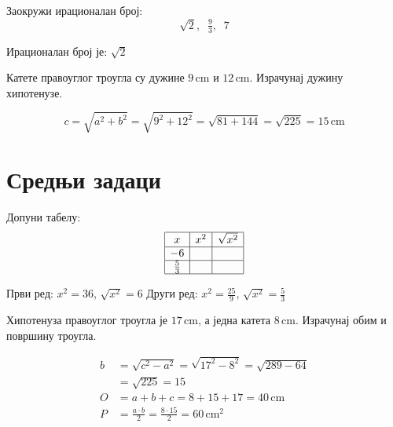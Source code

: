 \documentclass[11pt,a5paper,twoside,addpoints,noanswers]{exam} %
\newcommand{\measure}[2]{\mathrm{#1\,#2}}
\newcommand{\variant}[3]{#1}
\begin{document}
\begin{questions}
\question[2]
Заокружи ирационалан број:  
$$
\variant{\sqrt{2},\;\;\tfrac{9}{3},\;\;7}{-5,\;\;\sqrt{18},\;\;2}{\tfrac{4}{5},\;\;\sqrt{5},\;\;1,\!2}
$$
\begin{solution}[\stretch 1]
Ирационалан број је:  
\variant{$\sqrt{2}$}{$\sqrt{18}$}{$\sqrt{5}$}
\end{solution}

\ifprintanswers\else\newpage\fi

\question[3]
Катете правоуглог троугла су дужине
$\measure{\variant{9}{12}{8}}{cm}$ и
$\measure{\variant{12}{5}{15}}{cm}$.  
Израчунај дужину хипотенузе.
\begin{solution}[\stretch 2]
\[
c=\sqrt{a^2+b^2}=\sqrt{\variant{9^2+12^2}{12^2+5^2}{8^2+15^2}}
=\sqrt{\variant{81+144}{144+25}{64+225}}
=\sqrt{\variant{225}{169}{289}}
=\measure{\variant{15}{13}{17}}{cm}
\]
\end{solution}

\ifprintanswers\newpage\else\fi

\section{Средњи задаци}

\question[4]
Допуни табелу:
$$
\begin{array}{|c|c|c|}\hline
x & x^2 & \sqrt{x^2}\\\hline
\variant{-6}{\tfrac{3}{2}}{-4} & & \\\hline
\variant{\tfrac{5}{3}}{-2}{1,\!7} & & \\\hline
\end{array}
$$
\begin{solution}[\stretch 2]
Први ред: $x^2=\variant{36}{\tfrac{9}{4}}{16}$, $\sqrt{x^2}=\variant{6}{\tfrac{3}{2}}{4}$  
Други ред: $x^2=\variant{\tfrac{25}{9}}{4}{2,\!89}$, $\sqrt{x^2}=\variant{\tfrac{5}{3}}{2}{1,\!7}$
\end{solution}

\ifprintanswers\else\newpage\fi

\question[4]
Хипотенуза правоуглог троугла је
$\measure{\variant{17}{20}{25}}{cm}$, а једна катета
$\measure{\variant{8}{12}{15}}{cm}$.  
Израчунај обим и површину троугла.
\begin{solution}[\stretch 4]
\begin{align*}
b &= \sqrt{c^2-a^2} = \sqrt{\variant{17^2-8^2}{20^2-12^2}{25^2-15^2}}
= \sqrt{\variant{289-64}{400-144}{625-225}}\\
&= \sqrt{\variant{225}{256}{400}}=\variant{15}{16}{20}\\
O &= a+b+c = \variant{8+15+17}{12+16+20}{15+20+25}
=\measure{\variant{40}{48}{60}}{cm}\\
P &= \tfrac{a\cdot b}{2}=\tfrac{\variant{8\cdot15}{12\cdot16}{15\cdot20}}{2}
=\measure{\variant{60}{96}{150}}{cm^2}
\end{align*}
\end{solution}


\end{questions}
\end{document}

